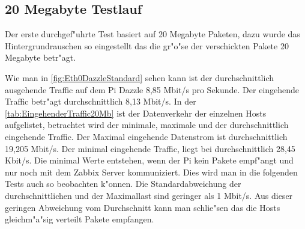\subsection{20 Megabyte Testlauf}
\label{subsec:20MBTest}
Der erste durchgef"uhrte Test basiert auf 20 Megabyte Paketen, dazu wurde das Hintergrundrauschen %
so eingestellt das die gr"o"se der verschickten Pakete 20 Megabyte betr"agt. 

Wie man in \cref{fig:Eth0DazzleStandard} sehen kann ist der durchschnittlich ausgehende Traffic auf dem Pi Dazzle 8,85 Mbit/s %
pro Sekunde. Der eingehende Traffic betr"agt durchschnittlich 8,13 Mbit/s. In der \cref{tab:EingehenderTraffic20Mb} %
ist der Datenverkehr der einzelnen Hosts aufgelistet, betrachtet wird der minimale, maximale und der durchschnittlich eingehende Traffic. %
Der Maximal eingehende Datenstrom ist durchschnittlich 19,205 Mbit/s. Der minimal eingehende Traffic, liegt bei %
durchschnittlich 28,45 Kbit/s. Die minimal Werte entstehen, wenn der Pi kein Pakete empf"angt und nur noch mit dem Zabbix Server kommuniziert. %
Dies wird man in die folgenden Tests auch so beobachten k"onnen. Die Standardabweichung der durchschnittlichen %
und der Maximallast sind geringer als 1 Mbit/s. Aus dieser geringen Abweichung vom Durchschnitt kann man schlie"sen das die Hosts %
gleichm"a"sig verteilt Pakete empfangen. %

